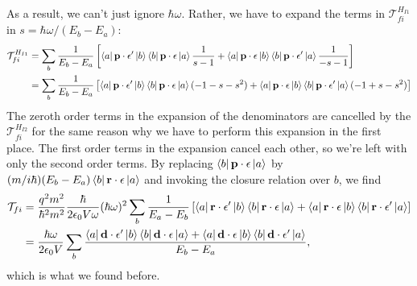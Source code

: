 \documentclass{article}
\theoremstyle{definition}
\newcommand{\f}[2]{\frac{#1}{#2}}
\newcommand{\lb}{\left[}
\newcommand{\rb}{\right]}
\begin{document}
\begin{enumerate}[label=(\alph*)]
As a result, we can't just ignore $\hbar \omega$. Rather, we have to expand the terms in $\mathcal{T}_{fi}^{H_{I1}}$ in $s = \hbar \omega / (E_b - E_a)$:
\begin{align*}
\mathcal{T}_{fi}^{H_{I1}}
&= 
\sum_b \f{1}{E_b - E_a}
 \lb 
 \bra{a} \mathbf{p}\cdot \mathbf{\epsilon'}  \ket{b} \bra{b}  \mathbf{p}\cdot \mathbf{\epsilon} \ket{a} \f{1}{s-1}
 +
 \bra{a}  \mathbf{p}\cdot \mathbf{\epsilon} \ket{b}\bra{b}  \mathbf{p}\cdot \mathbf{\epsilon'}  \ket{a}\f{1}{-s-1}
 \rb \\
 &= \sum_b \f{1}{E_b - E_a}
 \lb 
 \bra{a} \mathbf{p}\cdot \mathbf{\epsilon'}  \ket{b} \bra{b}  \mathbf{p}\cdot \mathbf{\epsilon} \ket{a} (-1-s-s^2)
 +
 \bra{a}  \mathbf{p}\cdot \mathbf{\epsilon} \ket{b}\bra{b}  \mathbf{p}\cdot \mathbf{\epsilon'}  \ket{a} (-1+s-s^2)
 \rb
\end{align*}
The zeroth order terms in the expansion of the denominators are cancelled by the $\mathcal{T}_{fi}^{H_{I2}}$ for the same reason why we have to perform this expansion in the first place. The first order terms in the expansion cancel each other, so we're left with only the second order terms. By replacing $\bra{b} \mathbf{p}\cdot \mathbf{\epsilon} \ket{a}$ by $(m/i\hbar) (E_b - E_a) \bra{b}  \mathbf{r}\cdot \mathbf{\epsilon}  \ket{a} $ and invoking the closure relation over $b$, we find 
\begin{align*}
\mathcal{T}_{fi} 
&= 
\f{q^2 m^2}{\hbar^2 m^2} \f{\hbar }{2\epsilon_0 V \omega} (\hbar \omega)^2
\sum_b \f{1}{E_a - E_b}
\lb 
 \bra{a} \mathbf{r}\cdot \mathbf{\epsilon'}  \ket{b} \bra{b}  \mathbf{r}\cdot \mathbf{\epsilon} \ket{a} 
 +
  \bra{a}  \mathbf{r}\cdot \mathbf{\epsilon} \ket{b}\bra{b}  \mathbf{r}\cdot \mathbf{\epsilon'}  \ket{a} 
\rb  \\
&= \f{\hbar \omega}{2\epsilon_0 V} \sum_b 
\f{
 \bra{a} \mathbf{d}\cdot \mathbf{\epsilon'}  \ket{b} \bra{b}  \mathbf{d}\cdot \mathbf{\epsilon} \ket{a} 
+
 \bra{a}  \mathbf{d}\cdot \mathbf{\epsilon} \ket{b}\bra{b}  \mathbf{d}\cdot \mathbf{\epsilon'}  \ket{a} 
}
{E_b - E_a},
\end{align*}
which is what we found before. 



\end{enumerate}
\end{document}
